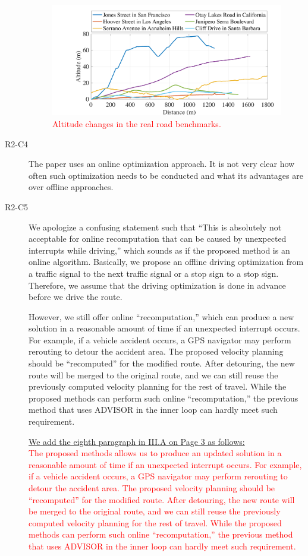 \documentclass[onecolumn]{IEEEconf}
\begin{document}
\begin{description}
\begin{figure} [h!]	 %
\centering
\renewcommand\thefigure{8}
\includegraphics[width=0.7\hsize]{Figures/Benchmark_altitude.pdf}
\caption{\textcolor{red}{Altitude changes in the real road benchmarks.}}
\label{fig:bench_altitude}
\end{figure} 


\item [R2-C4] The paper uses an online optimization approach. It is not very clear how often such optimization needs to be conducted and what its advantages are over offline approaches.

\item [R2-C5] We apologize a confusing statement such that ``This is absolutely not acceptable for online recomputation that can be caused by unexpected interrupts while driving,'' which sounds as if the proposed method is an online algorithm. Basically, we propose an offline driving optimization from a traffic signal to the next traffic signal or  a stop sign to a stop sign. Therefore, we assume that the driving optimization is done in advance before we drive the route.

However, we still offer online ``recomputation,'' which can produce a new solution in a reasonable amount of time if an unexpected interrupt occurs. For example, if a vehicle accident occurs, a GPS navigator may perform rerouting to detour the accident area. The proposed velocity planning should be ``recomputed'' for the modified route. After detouring, the new route will be merged to the original route, and we can still reuse the previously computed  velocity planning for the rest of travel. While the proposed methods can perform such online ``recomputation,'' the previous method that uses ADVISOR in the inner loop can hardly meet such requirement. 

\uline{We add the eighth paragraph in III.A on Page 3 as follows:}\\
\textcolor{red}{The proposed methods allows us to produce an updated solution in a reasonable amount of time if an unexpected interrupt occurs. For example, if a vehicle accident occurs, a GPS navigator may perform rerouting to detour the accident area. The proposed velocity planning should be ``recomputed'' for the modified route. After detouring, the new route will be merged to the original route, and we can still reuse the previously computed  velocity planning for the rest of travel. While the proposed methods can perform such online ``recomputation,'' the previous method that uses ADVISOR in the inner loop can hardly meet such requirement.}


\end{description}
\end{document}
